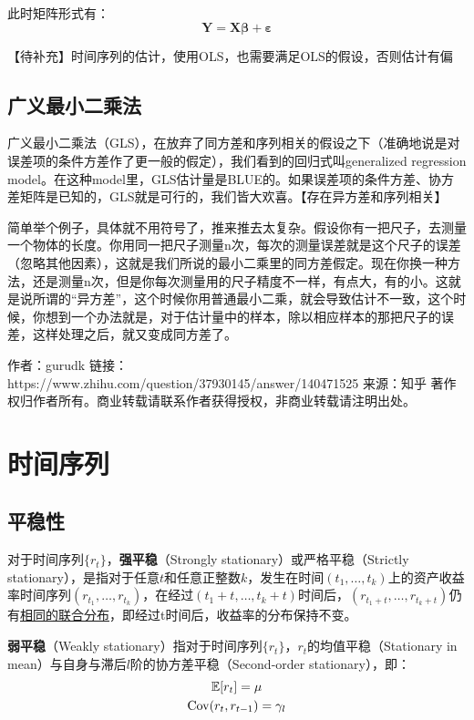 \documentclass[11pt]{article}
\begin{document}
此时矩阵形式有：
\begin{equation*}
    \bm{Y} = \bm{X} \bm{\beta} + \bm{\varepsilon}
\end{equation*}

【待补充】时间序列的估计，使用OLS，也需要满足OLS的假设，否则估计有偏

\subsection{广义最小二乘法}

广义最小二乘法（GLS），在放弃了同方差和序列相关的假设之下（准确地说是对误差项的条件方差作了更一般的假定），我们看到的回归式叫generalized regression model。在这种model里，GLS估计量是BLUE的。如果误差项的条件方差、协方差矩阵是已知的，GLS就是可行的，我们皆大欢喜。【存在异方差和序列相关】


简单举个例子，具体就不用符号了，推来推去太复杂。假设你有一把尺子，去测量一个物体的长度。你用同一把尺子测量n次，每次的测量误差就是这个尺子的误差（忽略其他因素），这就是我们所说的最小二乘里的同方差假定。现在你换一种方法，还是测量n次，但是你每次测量用的尺子精度不一样，有点大，有的小。这就是说所谓的“异方差”，这个时候你用普通最小二乘，就会导致估计不一致，这个时候，你想到一个办法就是，对于估计量中的样本，除以相应样本的那把尺子的误差，这样处理之后，就又变成同方差了。

作者：gurudk
链接：https://www.zhihu.com/question/37930145/answer/140471525
来源：知乎
著作权归作者所有。商业转载请联系作者获得授权，非商业转载请注明出处。

\section{时间序列}

\subsection{平稳性}

对于时间序列$\{r_t\}$，\textbf{强平稳}（Strongly stationary）或严格平稳（Strictly stationary），是指对于任意$t$和任意正整数$k$，发生在时间$(t_1,\dots,t_k)$上的资产收益率时间序列$(r_{t_1},\dots,r_{t_k})$，在经过$(t_1+t,\dots,t_k+t)$时间后，$(r_{t_1+t},\dots,r_{t_k+t})$仍有\uline{相同的联合分布}，即经过t时间后，收益率的分布保持不变。

\textbf{弱平稳}（Weakly stationary）指对于时间序列$\{r_t\}$，$r_t$的均值平稳（Stationary in mean）与自身与滞后$l$阶的协方差平稳（Second-order stationary），即：
\begin{gather*}
    \mathbb{E} [r_t] = \mu \\
    \operatorname{Cov} (r_t, r_{t-1}) = \gamma_l
\end{gather*}
\end{document}
